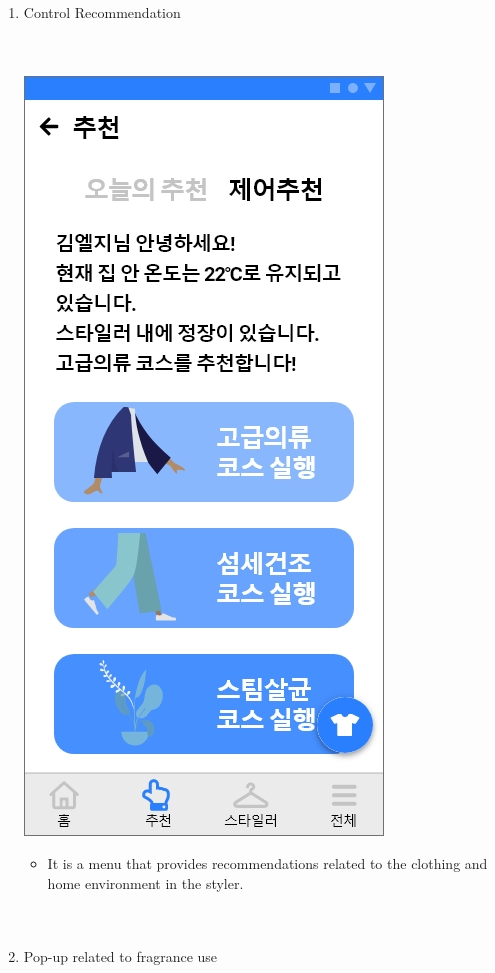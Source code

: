 \documentclass[conference]{IEEEtran}
\begin{document}
\begin{enumerate}
\begin{itemize}
\end{itemize}
       \item Control Recommendation \\ \\ \\
       \centerline{\includegraphics[scale=0.32]{assets/추천3.jpg}}
       \break
           \begin{itemize}
    \item[] It is a menu that provides recommendations related to the clothing and home environment in the styler.\\\\\\
\end{itemize}
     \item Pop-up related to fragrance use \\ \\

\end{enumerate}
\end{document}
